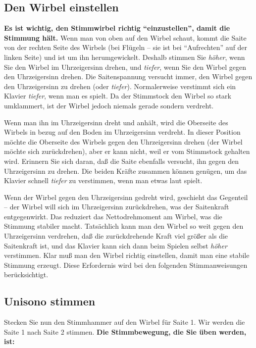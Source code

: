 \label{c2_5c}
\subsection{Den Wirbel einstellen}
\label{c2_5_wirb} 

\textbf{Es ist wichtig, den Stimmwirbel richtig \enquote{einzustellen}, damit die Stimmung hält.}
Wenn man von oben auf den Wirbel schaut, kommt die Saite von der rechten Seite des Wirbels (bei Flügeln -- sie ist bei \enquote{Aufrechten} auf der linken Seite) und ist um ihn herumgewickelt.
Deshalb stimmen Sie \textit{höher}, wenn Sie den Wirbel im Uhrzeigersinn drehen, und \textit{tiefer}, wenn Sie den Wirbel gegen den Uhrzeigersinn drehen.
Die Saitenspannung versucht immer, den Wirbel gegen den Uhrzeigersinn zu drehen (oder \textit{tiefer}).
Normalerweise verstimmt sich ein Klavier \textit{tiefer}, wenn man es spielt.
Da der Stimmstock den Wirbel so stark umklammert, ist der Wirbel jedoch niemals gerade sondern verdreht.

Wenn man ihn im Uhrzeigersinn dreht und anhält, wird die Oberseite des Wirbels in bezug auf den Boden im Uhrzeigersinn verdreht.
In dieser Position möchte die Oberseite des Wirbels gegen den Uhrzeigersinn drehen (der Wirbel möchte sich zurückdrehen), aber er kann nicht, weil er vom Stimmstock gehalten wird.
Erinnern Sie sich daran, daß die Saite ebenfalls versucht, ihn gegen den Uhrzeigersinn zu drehen.
Die beiden Kräfte zusammen können genügen, um das Klavier schnell \textit{tiefer} zu verstimmen, wenn man etwas laut spielt.

Wenn der Wirbel gegen den Uhrzeigersinn gedreht wird, geschieht das Gegenteil -- der Wirbel will sich im Uhrzeigersinn zurückdrehen, was der Saitenkraft entgegenwirkt.
Das reduziert das Nettodrehmoment am Wirbel, was die Stimmung stabiler macht.
Tatsächlich kann man den Wirbel so weit gegen den Uhrzeigersinn verdrehen, daß die zurückdrehende Kraft viel größer als die Saitenkraft ist, und das Klavier kann sich dann beim Spielen selbst \textit{höher} verstimmen.
Klar muß man den Wirbel richtig einstellen, damit man eine stabile Stimmung erzeugt.
Diese Erfordernis wird bei den folgenden Stimmanweisungen berücksichtigt.
 

\label{c2_5d}
\subsection{Unisono stimmen}
\label{c2_5_unis}

Stecken Sie nun den Stimmhammer auf den Wirbel für Saite 1.
Wir werden die Saite 1 nach Saite 2 stimmen.
\textbf{Die Stimmbewegung, die Sie üben werden, ist:}

